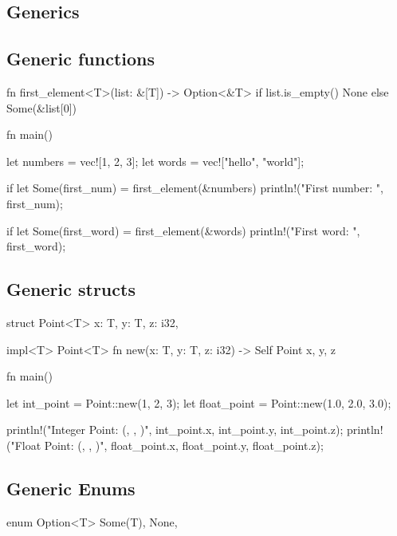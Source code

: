 \documentclass[8pt,a4paper,twocolumn]{extarticle}
\begin{document}
\begin{Code}

\section{Generics}

\subsection{Generic functions}

\begin{Code}

  fn first_element<T>(list: &[T]) -> Option<&T> {
      if list.is_empty() {
          None
      } else {
          Some(&list[0])
      }
  }

  fn main() {
      let numbers = vec![1, 2, 3];
      let words = vec!["hello", "world"];
      
      if let Some(first_num) = first_element(&numbers) {
          println!("First number: {}", first_num);
      }
      
      if let Some(first_word) = first_element(&words) {
          println!("First word: {}", first_word);
      }
  }
\end{Code}

\subsection{Generic structs}

\begin{Code}
  struct Point<T> {
      x: T,
      y: T,
      z: i32,
  }

  impl<T> Point<T> {
      fn new(x: T, y: T, z: i32) -> Self {
          Point { x, y, z }
      }
  }

  fn main() {
      let int_point = Point::new(1, 2, 3);
      let float_point = Point::new(1.0, 2.0, 3.0);
      
      println!("Integer Point: ({}, {}, {})", int_point.x, int_point.y, int_point.z);
      println!("Float Point: ({}, {}, {})", float_point.x, float_point.y, float_point.z);
  }
\end{Code}

\subsection{Generic Enums}

\begin{Code}
  enum Option<T> {
      Some(T),
      None,
  }


\end{Code}
\end{Code}
\end{document}
